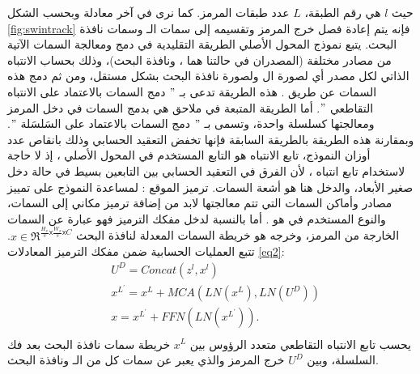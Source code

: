 حيث $l$ هي رقم الطبقة، $L$ عدد طبقات المرمز.
كما نرى في آخر معادلة وبحسب الشكل
\ref{fig:swintrack}
فإنه يتم إعادة فصل 
خرج المرمز وتقسيمه إلى سمات الـ
وسمات نافذة البحث.
\newline
يتبع نموذج المحول الأصلي
الطريقة التقليدية في
دمج ومعالجة السمات الآتية من مصادر مختلفة (المصدران في حالتنا هما
،
ونافذة البحث)، وذلك بحساب الانتباه الذاتي لكل مصدر أي لصورة ال
ولصورة نافذة البحث بشكل مستقل، ومن ثم دمج هذه السمات عن طريق 
.
هذه الطريقة تدعى بـ
$"$
دمج السمات بالاعتماد على الانتباه التقاطعي
$"$.
\newline
أما الطريقة المتبعة في ملاحق
هي بدمج السمات في دخل المرمز ومعالجتها كسلسلة واحدة، وتسمى بـ
$"$
دمج السمات بالاعتماد على السَلسَلة
$"$.
وبمقارنة هذه الطريقة بالطريقة السابقة فإنها تخفض التعقيد الحسابي وذلك بانقاص عدد أوزان النموذج، 
\newline
تابع الانتباه هو التابع المستخدم في المحول الأصلي
،
إذ لا حاجة لاستخدام تابع انتباه
،
لأن الفرق في التعقيد الحسابي بين التابعين بسيط في حالة دخل صغير الأبعاد، والدخل هنا هو أشعة السمات.
\newline
ترميز الموقع
:
لمساعدة النموذج على تمييز مصادر وأماكن السمات التي تتم معالجتها لابد من إضافة ترميز مكاني إلى السمات، والنوع المستخدم في 
هو 
.
\newline
أما بالنسبة لدخل  مفكك الترميز
 فهو عبارة عن السمات الخارجة من المرمز، وخرجه هو خريطة السمات المعدلة لنافذة البحث
$ x \in \Re^{\frac{H_x}{s} \mathsf{x} \frac{W_x}{s} \mathsf{x} C}$.
تتبع العمليات الحسابية ضمن مفكك الترميز
المعادلات 
\ref{eq2}:
\begin{equation} \label{eq2}
\begin{split}
&U^D = Concat(z^l,x^l)\\
&x^{L^\prime} = x^L + MCA(LN(x^L),LN(U^D))\\
&x = x^{L^\prime} + FFN(LN(x^{L^\prime})).\\
\end{split}
\end{equation}
يحسب تابع الانتباه التقاطعي متعدد الرؤوس
بين
$x^L$
 خريطة سمات نافذة البحث بعد فك السلسلة، وبين 
$U^D$
خرج المرمز والذي يعبر عن سمات كل من الـ
ونافذة البحث.

